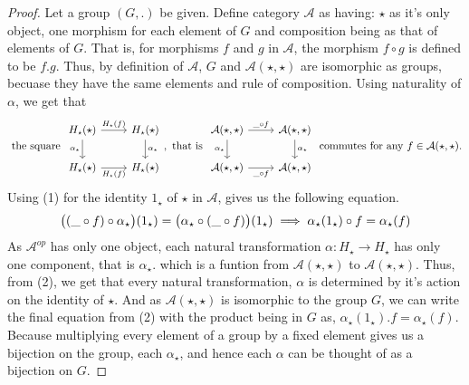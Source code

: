 \documentclass[18pt,a4paper]{article}
\theoremstyle{definition}
\begin{document}
\begin{proof} \setcounter{equation}{0} Let a group $(G,.)$ be given.
	Define category $\mathcal{A}$ as having: $\star$ as it's only object, one
	morphism for each element of $G$ and composition being as that of elements of $G$.
	That is, for morphisms $f$ and $g$ in $\mathcal{A}$, the morphism $f \circ g$ is defined to
	be $f.g$.
	Thus, by definition of $\mathcal{A}$, $G$ and $\mathcal{A}(\star, \star)$ are
	isomorphic as groups, becuase they have the same elements and rule of composition.
	Using naturality of $\alpha$, we get that
	\begin{equation}
		\text{ the square }
		\begin{tikzcd}
		H_\star(\star) \arrow[swap]{d}{\alpha_\star} \arrow{r}{H_\star(f)}
			& H_\star(\star) \arrow{d}{\alpha_\star}\\
		H_\star(\star) \arrow[swap]{r}{H_\star(f)}
			& H_\star(\star)
		\end{tikzcd}
		, \text{ that is }
		\begin{tikzcd}
			\mathcal{A} (\star,\star) \arrow[swap]{d}{\alpha_\star} \arrow{r}{\string _ \circ f}
			& \mathcal{A} (\star,\star) \arrow{d}{\alpha_\star}\\
			\mathcal{A} (\star,\star) \arrow[swap]{r}{ \string _ \circ f}
			& \mathcal{A} (\star,\star)
		\end{tikzcd}
		\text{ commutes for any } f \in \mathcal{A}(\star,\star).
	\end{equation}
	Using (1) for the identity $1_\star$ of $\star$ in $\mathcal{A}$,
	gives us the following equation.
	\begin{equation}
		\big( (\string _ \circ f) \circ \alpha_\star \big)(1_\star) =
		\big(  \alpha_\star \circ (\string _ \circ f)\big)(1_\star)
		\implies \alpha_\star(1_\star) \circ f=\alpha_\star(f)
	\end{equation}
	As $\mathcal{A} ^{op}$ has only one object, each natural transformation
	$\alpha:H_\star^{} \to H_\star^{}$ has only one component,
	that is $\alpha_\star$. which is a funtion from $\mathcal{A} (\star,\star)$ to
	$\mathcal{A} (\star,\star)$. Thus, from (2), we get that every natural transformation,
	$\alpha$ is determined by it's action on the identity of $\star$. And as $\mathcal{A}
	(\star, \star)$ is isomorphic to the group $G$, we can write the final equation from (2)
	with the product being in $G$ as, $\alpha_\star(1_\star).f=\alpha_\star(f)$. Because
	multiplying every element of a group by a fixed element gives us a bijection on the
	group, each $\alpha_\star$, and hence each $\alpha$ can be thought of as a bijection on
	$G$.


\end{proof}
\end{document}
